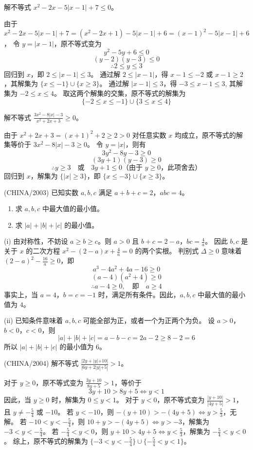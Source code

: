 \begin{questions}
\question 解不等式 $x^2-2x-5|x-1|+7 \le 0$。

\begin{solution}
由于 $x^2-2x-5|x-1|+7 = (x^2-2x+1)-5|x-1|+6 = (x-1)^2-5|x-1|+6$，
令 $y = |x-1|$，原不等式变为
\[
y^2-5y+6 \le 0
\]
\[
(y-2)(y-3) \le 0
\]
\[
\therefore 2 \le y \le 3
\]
回归到 $x$，即 $2 \le |x-1| \le 3$。
通过解 $2 \le |x-1|$，得 $x-1 \le -2$ 或 $x-1 \ge 2$，其解集为 $\{x \le -1\} \cup \{x \ge 3\}$。
通过解 $|x-1| \le 3$，得 $-3 \le x-1 \le 3$, 其解集为 $-2 \le x \le 4$。
取这两个解集的交集，原不等式的解集为
\[
\{-2 \le x \le -1\} \cup \{3 \le x \le 4\}
\]
\end{solution}

\question 解不等式 $\frac{3x^2-8|x|-3}{x^2+2x+3} \ge 0$。

\begin{solution}
由于 $x^2+2x+3 = (x+1)^2+2 \ge 2 > 0$ 对任意实数 $x$ 均成立，原不等式的解集等价于 $3x^2-8|x|-3 \ge 0$。
令 $y = |x|$，则有
\[
3y^2-8y-3 \ge 0
\]
\[
(3y+1)(y-3) \ge 0
\]
\[
\therefore y \ge 3 \quad \text{或} \quad 3y+1 \le 0 \text{（由于 } y \ge 0\text{，此项舍去）}
\]
回归到 $x$，解集为 $\{|x| \ge 3\}$，即 $\{x \le -3\} \cup \{x \ge 3\}$。
\end{solution}

\question (CHINA/2003) 已知实数 $a, b, c$ 满足 $a+b+c=2$，$abc=4$。
\begin{enumerate}
    \item 求 $a, b, c$ 中最大值的最小值。
    \item 求 $|a|+|b|+|c|$ 的最小值。
\end{enumerate}

\begin{solution}
(i) 由对称性，不妨设 $a \ge b \ge c$。则 $a > 0$ 且 $b+c = 2-a$，$bc = \frac{4}{a}$。
因此 $b, c$ 是关于 $x$ 的二次方程 $x^2-(2-a)x+\frac{4}{a}=0$ 的两个实根。
判别式 $\Delta \ge 0$ 意味着 $(2-a)^2 - \frac{16}{a} \ge 0$，即
\[
a^3-4a^2+4a-16 \ge 0
\]
\[
(a-4)(a^2+4) \ge 0
\]
\[
\therefore a-4 \ge 0, \quad \text{即} \quad a \ge 4
\]
事实上，当 $a=4$，$b=c=-1$ 时，满足所有条件。因此，$a, b, c$ 中最大值的最小值为 $4$。

(ii) 已知条件意味着 $a, b, c$ 可能全部为正，或者一个为正两个为负。
设 $a > 0$，$b < 0$，$c < 0$，则
\[
|a|+|b|+|c| = a-b-c = 2a-2 \ge 8-2 = 6
\]
所以 $|a|+|b|+|c|$ 的最小值为 $6$。
\end{solution}

\question (CHINA/2004) 解不等式 $\frac{|2y+|y|+10|}{|6y+2|y|+5|} > 1$。

\begin{solution}
对于 $y \ge 0$，原不等式变为 $\frac{3y+10}{8y+5} > 1$，等价于
\[
3y+10 > 8y+5 \iff y < 1
\]
因此，当 $y \ge 0$ 时，解集为 $0 \le y < 1$。
对于 $y < 0$，原不等式变为 $\frac{|y+10|}{|4y+5|} > 1$，且 $y \neq -\frac{5}{4}$ 或 $-10$。
若 $y < -10$，则 $-(y+10) > -(4y+5) \iff y > \frac{5}{3}$，无解。
若 $-10 < y < -\frac{5}{4}$，则 $10+y > -(4y+5) \iff y > -3$，解集为 $-3 < y < -\frac{5}{4}$。
若 $-\frac{5}{4} < y < 0$，则 $y+10 > 4y+5 \iff y < \frac{5}{3}$，解集为 $-\frac{5}{4} < y < 0$。
综上，原不等式的解集为 $\{-3 < y < -\frac{5}{4}\} \cup \{-\frac{5}{4} < y < 1\}$。
\end{solution}


\end{questions}
